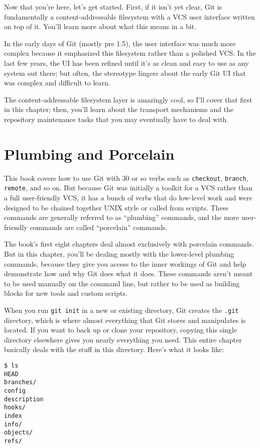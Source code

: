 \documentclass[a4paper]{book}
\begin{document}
Now that you're here, let's get started. First, if it isn't yet clear, Git is fundamentally a content-addressable filesystem with a VCS user interface written on top of it. You'll learn more about what this means in a bit.

In the early days of Git (mostly pre 1.5), the user interface was much more complex because it emphasized this filesystem rather than a polished VCS. In the last few years, the UI has been refined until it's as clean and easy to use as any system out there; but often, the stereotype lingers about the early Git UI that was complex and difficult to learn.

The content-addressable filesystem layer is amazingly cool, so I'll cover that first in this chapter; then, you'll learn about the transport mechanisms and the repository maintenance tasks that you may eventually have to deal with.

\section{Plumbing and Porcelain}

This book covers how to use Git with 30 or so verbs such as \texttt{checkout}, \texttt{branch}, \texttt{remote}, and so on. But because Git was initially a toolkit for a VCS rather than a full user-friendly VCS, it has a bunch of verbs that do low-level work and were designed to be chained together UNIX style or called from scripts. These commands are generally referred to as “plumbing” commands, and the more user-friendly commands are called “porcelain” commands.

The book's first eight chapters deal almost exclusively with porcelain commands. But in this chapter, you'll be dealing mostly with the lower-level plumbing commands, because they give you access to the inner workings of Git and help demonstrate how and why Git does what it does. These commands aren't meant to be used manually on the command line, but rather to be used as building blocks for new tools and custom scripts.

When you run \texttt{git init} in a new or existing directory, Git creates the \texttt{.git} directory, which is where almost everything that Git stores and manipulates is located. If you want to back up or clone your repository, copying this single directory elsewhere gives you nearly everything you need. This entire chapter basically deals with the stuff in this directory. Here's what it looks like:

\begin{shaded}\begin{verbatim}
$ ls
HEAD
branches/
config
description
hooks/
index
info/
objects/
refs/
\end{verbatim}\end{shaded}
\end{document}
